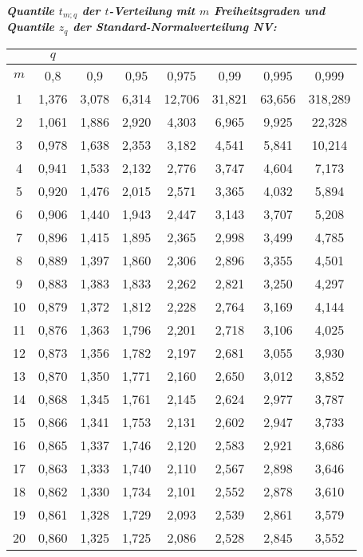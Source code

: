 {\bf \slshape \sffamily Quantile $t_{m;q}$ der $t$-Verteilung mit $m$ Freiheitsgraden und}\\
{\bf \slshape \sffamily Quantile $z_{q}$ der Standard-Normalverteilung NV:}
\renewcommand{\arraystretch}{0.9}
\begin{table}[h]
	\small
\begin{tabular}{|c|ccccccc|}
\hline
{} & $q$ & {} & {} & {} & {} & {} & {} \\ \hline
$m$ & 0,8 & 0,9 & 0,95 & 0,975 & 0,99 & 0,995 & 0,999 \\ \hline
1 & 1,376 & 3,078 & 6,314 & 12,706 & 31,821 & 63,656 & 318,289 \\
2 & 1,061 & 1,886 & 2,920 & 4,303 & 6,965 & 9,925 & 22,328 \\
3 & 0,978 & 1,638 & 2,353 & 3,182 & 4,541 & 5,841 & 10,214 \\
4 & 0,941 & 1,533 & 2,132 & 2,776 & 3,747 & 4,604 & 7,173 \\
5 & 0,920 & 1,476 & 2,015 & 2,571 & 3,365 & 4,032 & 5,894 \\ \hline
6 & 0,906 & 1,440 & 1,943 & 2,447 & 3,143 & 3,707 & 5,208 \\
7 & 0,896 & 1,415 & 1,895 & 2,365 & 2,998 & 3,499 & 4,785 \\
8 & 0,889 & 1,397 & 1,860 & 2,306 & 2,896 & 3,355 & 4,501 \\
9 & 0,883 & 1,383 & 1,833 & 2,262 & 2,821 & 3,250 & 4,297 \\
10 & 0,879 & 1,372 & 1,812 & 2,228 & 2,764 & 3,169 & 4,144 \\ \hline
11 & 0,876 & 1,363 & 1,796 & 2,201 & 2,718 & 3,106 & 4,025 \\
12 & 0,873 & 1,356 & 1,782 & 2,197 & 2,681 & 3,055 & 3,930 \\
13 & 0,870 & 1,350 & 1,771 & 2,160 & 2,650 & 3,012 & 3,852 \\
14 & 0,868 & 1,345 & 1,761 & 2,145 & 2,624 & 2,977 & 3,787 \\
15 & 0,866 & 1,341 & 1,753 & 2,131 & 2,602 & 2,947 & 3,733 \\ \hline
16 & 0,865 & 1,337 & 1,746 & 2,120 & 2,583 & 2,921 & 3,686 \\
17 & 0,863 & 1,333 & 1,740 & 2,110 & 2,567 & 2,898 & 3,646 \\
18 & 0,862 & 1,330 & 1,734 & 2,101 & 2,552 & 2,878 & 3,610 \\
19 & 0,861 & 1,328 & 1,729 & 2,093 & 2,539 & 2,861 & 3,579 \\
20 & 0,860 & 1,325 & 1,725 & 2,086 & 2,528 & 2,845 & 3,552 \\ \hline

\end{tabular}
\end{table}
